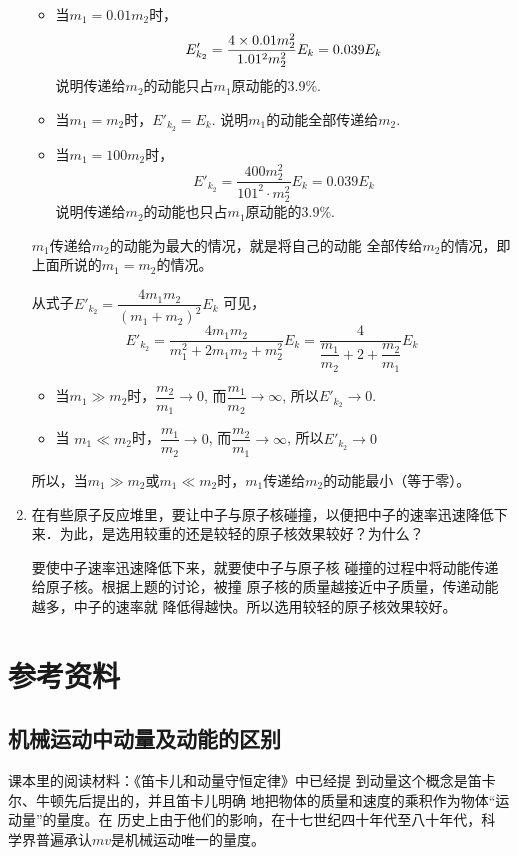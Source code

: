 \begin{enumerate}
\begin{solution}
\begin{itemize}
\item 当$m_1=0.01m_2$时，
\[E'_{k_2}=\frac{4\times 0.01m_2^2}{1.01^2m_2^2}E_k=0.039E_k\]
说明传递给$m_2$的动能只占$m_1$原动能的3.9\%.
\item 当$m_1=m_2$时，$E'_{k_2}=E_k$. 说明$m_1$的动能全部传递给$m_2$.
\item 
当$m_1=100m_2$时，
$$E'_{k_2}=\frac{400m^2_2}{101^2\cdot m^2_2}E_k=0.039E_k$$
说明传递给$m_2$的动能也只占$m_1$原动能的3.9\%.
\end{itemize}

$m_1$传递给$m_2$的动能为最大的情况，就是将自己的动能
全部传给$m_2$的情况，即上面所说的$m_1=m_2$的情况。

从式子$E'_{k_2}=\dfrac{4m_1m_2}{(m_1+m_2)^2}E_k$ 可见，
\[E'_{k_2}=\frac{4m_1m_2}{m_1^2+2m_1m_2+m_2^2}E_k=\frac{4}{\dfrac{m_1}{m_2}+2+\dfrac{m_2}{m_1}}E_k\]

\begin{itemize}
    \item 当$m_1\gg m_2$时，$\dfrac{m_2}{m_1}\to 0$, 而$\dfrac{m_1}{m_2}\to \infty$, 所以$E'_{k_2}\to 0$. 
    \item 当
$m_1\ll m_2$时，$\dfrac{m_1}{m_2}\to 0$, 而$\dfrac{m_2}{m_1}\to \infty$, 所以$E'_{k_2}\to 0$
\end{itemize}

所以，当$m_1\gg m_2$或$m_1\ll m_2$时，$m_1$传递给$m_2$的动能最小（等于零）。
\end{solution}
\item 在有些原子反应堆里，要让中子与原子核碰撞，以便把中子的速率迅速降低下来．为此，是选用较重的还是较轻的原子核效果较好？为什么？


\begin{solution}
    要使中子速率迅速降低下来，就要使中子与原子核
    碰撞的过程中将动能传递给原子核。根据上题的讨论，被撞
    原子核的质量越接近中子质量，传递动能越多，中子的速率就
    降低得越快。所以选用较轻的原子核效果较好。
\end{solution}
\end{enumerate}


\section{参考资料}
\subsection{机械运动中动量及动能的区别}

课本里的阅读材料：《笛卡儿和动量守恒定律》中已经提
到动量这个概念是笛卡尔、牛顿先后提出的，并且笛卡儿明确
地把物体的质量和速度的乘积作为物体“运动量”的量度。在
历史上由于他们的影响，在十七世纪四十年代至八十年代，科
学界普遍承认$mv$是机械运动唯一的量度。


